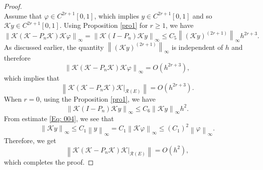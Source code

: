 \documentclass[pdflatex, sn-mathphys-num]{sn-jnl}%
\newcommand{\norm}[1]{\left\lVert #1\right\rVert}
\theoremstyle{thmstyleone}%
\theoremstyle{thmstyletwo}%
\theoremstyle{thmstylethree}%
\begin{document}
\begin{proof}
\begin{equation*}
	\end{equation*}
	Assume that \(\varphi \in C^{2r+1}[0,1]\), which implies \(y \in C^{2r+1}[0,1]\) and so \(\mathcal{K}y \in C^{2r+1}[0,1]\). Using Proposition \ref{pro1} for \(r \geq 1\), we have
	\begin{equation*}
		\norm{\mathcal{K}(\mathcal{K} - P_n \mathcal{K}) \mathcal{K} \varphi }_\infty = \norm{\mathcal{K}(I - P_n ) \mathcal{K} y }_\infty \leq C_5 \norm{(\mathcal{K} y)^{(2r+1)}}_{ \infty} h^{2r + 3}.
	\end{equation*}
	As discussed earlier, the quantity \( \norm{(\mathcal{K} y)^{(2r+1)}}_{\infty} \) is independent of \( h \) and therefore
	\begin{equation*}
		\norm{\mathcal{K}(\mathcal{K} - P_n \mathcal{K}) \mathcal{K} \varphi }_\infty =  O\left(h^{2r + 3}\right),
	\end{equation*}
	which implies that
	\begin{equation*}
		\norm{ \mathcal{K} (\mathcal{K} - P_n \mathcal{K}) \mathcal{K} |_{\mathcal{R}(E)} } =  O\left(h^{2r + 3}\right).
	\end{equation*}
	When \(r=0\), using the Proposition \ref{pro1}, we have 
	\begin{equation*}
		\norm{\mathcal{K}(I - P_n ) \mathcal{K} y }_\infty \leq C_6 \norm{\mathcal{K} y}_{ \infty} h^{2}.
	\end{equation*}
	From estimate \eqref{Eq: 004}, we see that
	\begin{equation*}
		\norm{\mathcal{K} y}_{ \infty} \leq C_1 \norm{y}_\infty = C_1 \norm{\mathcal{K}\varphi}_\infty \leq(C_1)^2  \norm{\varphi}_\infty. 
	\end{equation*} 
	Therefore, we get
	\begin{equation*}
		\norm{ \mathcal{K} (\mathcal{K} - P_n \mathcal{K}) \mathcal{K} |_{\mathcal{R}(E)} } = O\left(h^{2}\right),
	\end{equation*}
	which completes the proof.
	
\end{proof}
\end{document}

